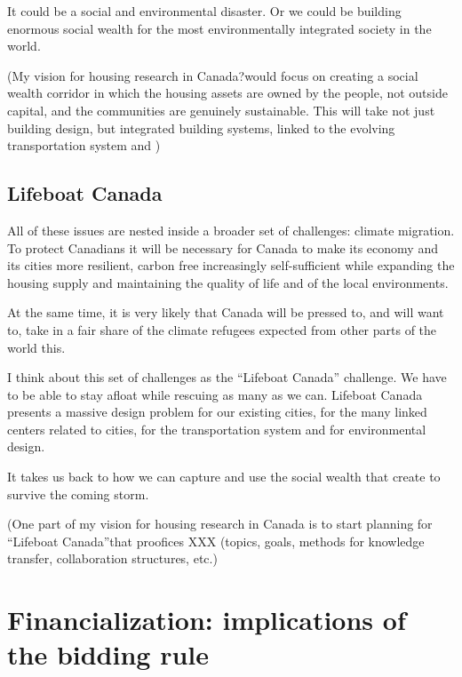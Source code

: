 It could be a social and environmental disaster. Or we could be building enormous social wealth for the most environmentally integrated society in the  world. 
    
        {\color{red}(My vision for housing research in Canada?would focus on creating a social wealth corridor in which the housing assets are owned by the people, not outside capital, and the communities are genuinely sustainable. This will take not just building design, but integrated building systems, linked to the evolving transportation system and )}

 \subsection{Lifeboat Canada}
 All of these issues are nested inside a broader set of challenges: climate migration. To protect Canadians it will be necessary for Canada to make its economy and its cities more resilient, carbon free  increasingly self-sufficient while expanding the housing supply and  maintaining the quality of life and of the local environments. 
 
 At the same time, it is very likely that Canada will be pressed to, and will want to, take in a fair share of the climate refugees expected from  other parts of the world this.

 I think about this  set of challenges as the ``Lifeboat Canada'' challenge. We have to be able to stay afloat while rescuing as many as we can. Lifeboat Canada presents a massive design problem  for our  existing cities, for the many linked centers related to cities, for the transportation system and for environmental design. 

 It takes us back to how we can capture and use the social wealth that create to survive the coming storm. 
 

  {\color{red}(One part of my vision for housing research in Canada  is to start planning for ``Lifeboat Canada''that proofices XXX (topics, goals, methods for knowledge transfer, collaboration structures, etc.)}
 
\section{Financialization: implications of the bidding rule}

